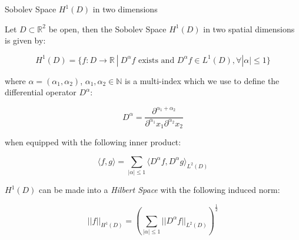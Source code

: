 \begin{definition}\label{def:twod-H1-D}
    Sobolev Space $H^1(D)$ in two dimensions

    Let $D \subset \mathbb{R}^2$ be open, then the Sobolev Space $H^1(D)$ in
    two spatial dimensions is given by:

    \begin{equation}\label{eq:twod-H1-D}
        H^1(D) = \{f: D \rightarrow \mathbb{R}\ |\
            D^\alpha f \text{ exists and } D^\alpha f \in L^1(D),
            \forall |\alpha| \leq 1 \}
    \end{equation}

    where $\alpha = (\alpha_1, \alpha_2)$, $\alpha_1, \alpha_2 \in \mathbb{N}$
    is a multi-index which we use to define the differential operator $D^\alpha$:

    \[
        D^\alpha = \frac{\partial^{\alpha_1 + \alpha_2}}
        {\partial^{\alpha_1}x_1\partial^{\alpha_2}x_2}
    \]

    when equipped with the following inner product:

    \begin{equation}\label{eq:twod-H1-D-inner-product}
        \langle f, g\rangle =
            \sum_{|\alpha| \leq 1}\langle D^\alpha f, D^\alpha g \rangle_{L^2(D)}
    \end{equation}

    $H^1(D)$ can be made into a \textit{Hilbert Space} with the following
    induced norm:

    \begin{equation}\label{eq:twod-H1-D-norm}
        ||f||_{H^1(D)} =
         \left(\sum_{|\alpha| \leq 1}||D^\alpha f||_{L^2(D)}\right)^\frac{1}{2}
    \end{equation}
\end{definition}
